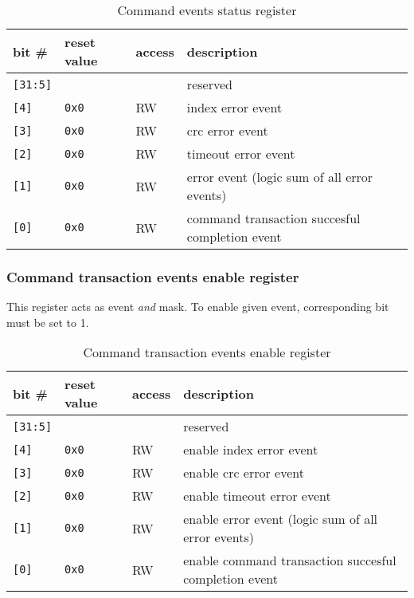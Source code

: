     \begin{table}[H]
    \caption{Command events status register}
        \begin{tabular}{m{1.3cm}|m{2cm}|m{1cm}|m{8cm}}
                \rowcolor[gray]{0.7} bit \# & reset value & access & description \\ \hline \hline
                \texttt{[31:5]} & & & reserved \\ \hline
                \texttt{[4]} & \texttt{0x0} & RW & index error event \\ \hline
                \texttt{[3]} & \texttt{0x0} & RW & crc error event \\ \hline
                \texttt{[2]} & \texttt{0x0} & RW & timeout error event \\ \hline
                \texttt{[1]} & \texttt{0x0} & RW & error event (logic sum of all error events) \\ \hline
                \texttt{[0]} & \texttt{0x0} & RW & command transaction succesful completion event \\ \hline
                \hline
        \end{tabular}
        \label{tab:cmd_evt_reg}
    \end{table}
    
    \subsubsection{Command transaction events enable register}
    \label{sec:cmd_ena_reg}
    
    This register acts as event \textit{and} mask. To enable given event, corresponding bit must be set to 1.
    
    \begin{table}[H]
    \caption{Command transaction events enable register}
        \begin{tabular}{m{1.3cm}|m{2cm}|m{1cm}|m{8cm}}
                \rowcolor[gray]{0.7} bit \# & reset value & access & description \\ \hline \hline
                \texttt{[31:5]} & & & reserved \\ \hline
                \texttt{[4]} & \texttt{0x0} & RW & enable index error event \\ \hline
                \texttt{[3]} & \texttt{0x0} & RW & enable crc error event \\ \hline
                \texttt{[2]} & \texttt{0x0} & RW & enable timeout error event \\ \hline
                \texttt{[1]} & \texttt{0x0} & RW & enable error event (logic sum of all error events) \\ \hline
                \texttt{[0]} & \texttt{0x0} & RW & enable command transaction succesful completion event \\ \hline
                \hline
        \end{tabular}
        \label{tab:cmd_ena_reg}
    \end{table}
    
